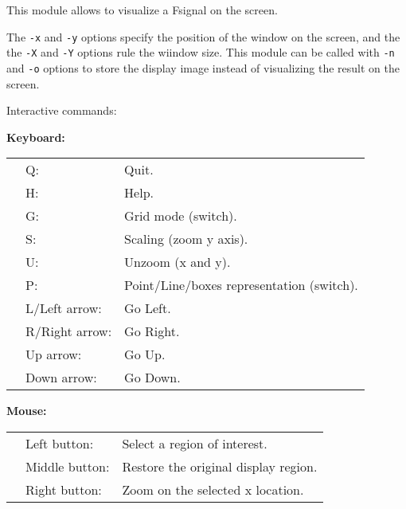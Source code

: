 This module allows to visualize a Fsignal on the screen.

\medskip

The \verb+-x+ and \verb+-y+ options specify the position of the
window on the screen, and the the \verb+-X+ and \verb+-Y+ options 
rule the wiindow size. This module can be called with \verb+-n+
and \verb+-o+ options to store the display image instead of
visualizing the result on the screen.

\bigskip

Interactive commands:

\bigskip

{\bf Keyboard:}
\begin{tabular}{lll}
&  Q:  &Quit.\\
&  H:  &Help.\\
&  G:  &Grid mode (switch).\\
&  S:  &Scaling (zoom y axis).\\
&  U:  &Unzoom (x and y).\\
&  P:  &Point/Line/boxes representation (switch).\\
&  L/Left arrow:   &Go Left.\\
&  R/Right arrow:  &Go Right.\\
&  Up arrow:       &Go Up.\\
&  Down arrow:     &Go Down.\\
\end{tabular}

\bigskip

{\bf Mouse:}
\begin{tabular}{lll}
&  Left button:    & Select a region of interest. \\
&  Middle button:  & Restore the original display region.\\
&  Right button:   & Zoom on the selected x location.\\
\end{tabular}


